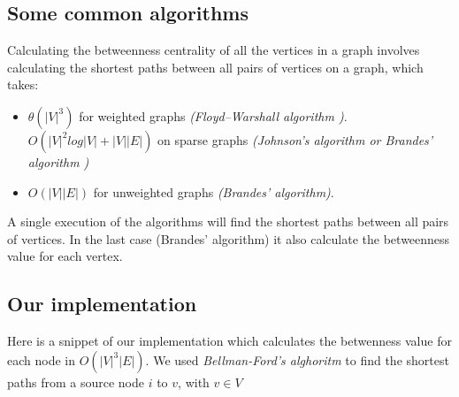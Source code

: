 \documentclass[11pt]{article}
\begin{document}
    \hypertarget{some-common-algorithms}{%
\subsection{Some common algorithms}\label{some-common-algorithms}}

Calculating the betweenness centrality of all the vertices in a graph
involves calculating the shortest paths between all pairs of vertices on
a graph, which takes:
\begin{itemize}
    \item  $\theta(|V|^3)$ for weighted graphs \emph{(Floyd--Warshall algorithm \cite{floyd_washall})}. 
    \newline $O(|V|^2 log|V| + |V||E|)$ on
sparse graphs \emph{(Johnson's algorithm \cite{jhonson} or Brandes' algorithm \cite{brandes})} 
\item $O(|V||E|)$ for unweighted graphs \emph{(Brandes' algorithm)}.
\end{itemize}

A single execution of the algorithms will find the shortest paths
between all pairs of vertices. In the last case (Brandes' algorithm) it
also calculate the betweenness value for each vertex.

    \hypertarget{our-implementation}{%
\subsection{Our implementation}\label{our-implementation}}

Here is a snippet of our implementation which calculates the betwenness
value for each node in \(O(|V|^3|E|)\). We used \emph{Bellman-Ford's
alghoritm} to find the shortest paths from a source node \(i\) to \(v\),
with \(v \in V\)
\end{document}
